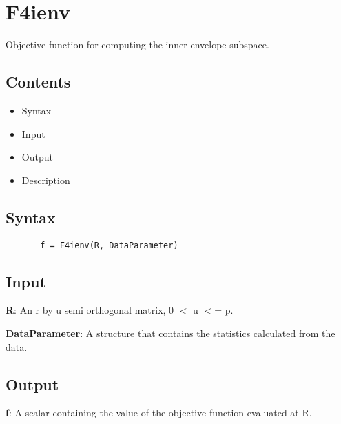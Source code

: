 \documentclass[a4paper,11pt,openany]{memoir}
\begin{document}
\newpage

 \rmfamily
\color{black}\section{F4ienv}

\begin{par}
Objective function for computing the inner envelope subspace.
\end{par} \vspace{1em}

\subsection*{Contents}

\begin{itemize}
\setlength{\itemsep}{-1ex}
   \item Syntax
   \item Input
   \item Output
   \item Description
\end{itemize}


\subsection*{Syntax}


\begin{verbatim}       f = F4ienv(R, DataParameter)\end{verbatim}
    

\subsection*{Input}

\begin{par}
\textbf{R}: An r by u semi orthogonal matrix, 0 \ensuremath{<} u \ensuremath{<}= p.
\end{par} \vspace{1em}
\begin{par}
\textbf{DataParameter}: A structure that contains the statistics calculated from the data.
\end{par} \vspace{1em}


\subsection*{Output}

\begin{par}
\textbf{f}: A scalar containing the value of the objective function evaluated at R.
\end{par} \vspace{1em}
\end{document}
